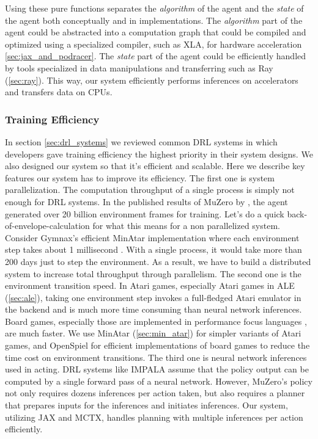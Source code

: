Using these pure functions separates the \textit{algorithm} of the agent and the \textit{state} of the agent both conceptually and in implementations.
The \textit{algorithm} part of the agent could be abstracted into a computation graph that could be compiled and optimized using a specialized compiler, such as XLA, for hardware acceleration \ref{sec:jax_and_podracer}.
The \textit{state} part of the agent could be efficiently handled by tools specialized in data manipulations and transferring such as Ray (\ref{sec:ray}).
This way, our system efficiently performs inferences on accelerators and transfers data on CPUs.

\subsubsection{Training Efficiency}
In section \ref{sec:drl_systems} we reviewed common DRL systems in which developers gave training efficiency the highest priority in their system designs.
We also designed our system so that it's efficient and scalable.
Here we describe key features our system has to improve its efficiency.
The first one is system parallelization.
The computation throughput of a single process is simply not enough for DRL systems.
In the published results of MuZero by \cite{MasteringAtariGo_Schrittwieser.Antonoglou.ea_2020}, the agent generated over 20 billion environment frames for training.
Let's do a quick back-of-envelope-calculation for what this means for a non parallelized system.
Consider Gymnax's efficient MinAtar implementation where each environment step takes about 1 millisecond \cite{GymnaxJAXbasedReinforcement_RobertTjarkoLange_2022}.
With a single process, it would take more than 200 days just to step the environment.
As a result, we have to build a distributed system to increase total throughput through parallelism.
The second one is the environment transition speed.
In Atari games, especially Atari games in ALE (\ref{sec:ale}), taking one environment step invokes a full-fledged Atari emulator in the backend and is much more time consuming than neural network inferences.
Board games, especially those are implemented in performance focus languages , are much faster.
We use MinAtar (\ref{sec:min_atar}) for simpler variants of Atari games, and OpenSpiel for efficient implementations of board games to reduce the time cost on environment transitions.
The third one is neural network inferences used in acting.
DRL systems like IMPALA assume that the policy output can be computed by a single forward pass of a neural network.
However, MuZero's policy not only requires dozens inferences per action taken, but also requires a planner that prepares inputs for the inferences and initiates inferences.
Our system, utilizing JAX and MCTX, handles planning with multiple inferences per action efficiently.

